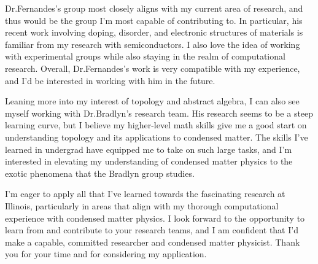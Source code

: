 \documentclass[11pt]{article}
\newcommand{\schoolabbr}{Illinois}
\begin{document}
Dr.\@ Fernandes's group most closely aligns with my current area of research, and thus would be the group I'm most capable of contributing to. In particular, his recent work involving doping, disorder, and electronic structures of materials is familiar from my research with semiconductors. I also love the idea of working with experimental groups while also staying in the realm of computational research. Overall, Dr.\@ Fernandes's work is very compatible with my experience, and I'd be interested in working with him in the future.

Leaning more into my interest of topology and abstract algebra, I can also see myself working with Dr.\@ Bradlyn's research team. His research seems to be a steep learning curve, but I believe my higher-level math skills give me a good start on understanding topology and its applications to condensed matter. The skills I've learned in undergrad have equipped me to take on such large tasks, and I'm interested in elevating my understanding of condensed matter physics to the exotic phenomena that the Bradlyn group studies.

I'm eager to apply all that I've learned towards the fascinating research at \schoolabbr{}, particularly in areas that align with my thorough computational experience with condensed matter physics. I look forward to the opportunity to learn from and contribute to your research teams, and I am confident that I'd make a capable, committed researcher and condensed matter physicist. Thank you for your time and for considering my application.
\end{document}
